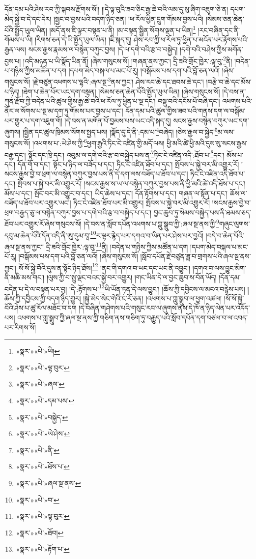 དོན་དམ་པའི་ཤེས་རབ་ཀྱི་སྐབས་རྫོགས་སོ།། །།དེ་ལྟ་བུའི་ཟབ་ཅིང་རྒྱ་ཆེ་བའི་ལམ་དུ་སུ་ཞིག་འཇུག་ཅེ་ན། དཔག་མེད་སྐྱེ་བ་དེ་དང་དེར། །སྦྱང་བ་བྱས་པའི་བདག་ཉིད་ཅན། །ཕ་རོལ་ཕྱིན་དྲུག་གོམས་བྱས་པའི། །སེམས་ཅན་ཆེན་པོའི་སྤྱོད་ཡུལ་ཡིན། །མདོ་ནས་ཇི་ལྟར་བསྟན་པ་ནི། །མ་བསྟན་སྦྱིན་སོགས་ལྡན་པ་ཡིན།\footnote{«སྣར་»«པེ་»ཡི།} །རང་བཞིན་དང་ནི་གོམས་པ་ཡི། །རིགས་ཅན་དེ་ཡི་སྤྱོད་ཡུལ་ཡིན། །ཇི་སྐད་དུ། ཤེས་རབ་ཀྱི་ཕ་རོལ་ཏུ་ཕྱིན་པ་མངོན་པར་རྟོགས་པའི་རྒྱན་ལས། སངས་རྒྱས་རྣམས་ལ་བསྙེན་བཀུར་བྱས། །དེ་ལ་དགེ་བའི་རྩ་བ་བསྐྱེད། །དགེ་བའི་བཤེས་ཀྱིས་མགོན་བྱས་པ། །འདི་མཉན་པ་ཡི་སྣོད་ཡིན་ནོ། །ཞེས་གསུངས་སོ། །གཞན་ནས་ཀྱང་། དྲི་ཟའི་གྲོང་ཁྱེར་:ལྟ་བུ་\footnote{«སྣར་»«པེ་»ལྟ་བུར་}ནི། །བདེན་པ་གཉིས་ཀྱིས་མཚོན་པ་དག །དཔག་མེད་བསྐལ་པ་མང་པོ་རུ། །བསྒོམས་པས་དག་པའི་བློ་ཅན་ལའོ། །ཞེས་གསུངས་སོ། །རྗེ་བཙུན་འཕགས་པ་ལྷའི་:ཞལ་སྔ་\footnote{«སྣར་»«པེ་»ཞལ་}ནས་ཀྱང་། ཤེས་རབ་ཆེ་དང་ཐབས་ཆེ་དང་། །བརྩེ་བ་ཆེ་དང་མོས་པ་ཉིད། །ཐེག་པ་ཆེན་པོར་ཡང་དག་བསྟན། །སེམས་ཅན་ཆེན་པོའི་སྤྱོད་ཡུལ་ཡིན། །ཞེས་གསུངས་སོ། །དེ་བས་ན་ཀུན་རྫོབ་ཀྱི་བདེན་པའི་ཚུལ་གྱིས་རྒྱ་ཆེ་བའི་ཕ་རོལ་ཏུ་ཕྱིན་པ་ལྔ་དང་། བསྡུ་བའི་དངོས་པོ་བཞི་དང་། འཕགས་པའི་ནོར་ལ་སོགས་པ་སྔ་མ་དག་ཏུ་གོམས་པར་བྱས་པ་དང་། དོན་དམ་པའི་ཚུལ་གྱིས་ཟབ་པའི་གནས་དག་ལ་བསྒོམ་པར་གྱུར་པ་དག་འཇུག་གོ། །དེ་བས་ན་མགོན་པོ་བྱམས་པས་ཡང་འདི་སྐད་དུ། སངས་རྒྱས་བསྙེན་བཀུར་ཡང་དག་ཞུགས། །སྦྱིན་དང་ཚུལ་ཁྲིམས་སོགས་སྤྱད་པས། །སྣོད་དུ་དེ་ནི་:དམ་པ་\footnote{«སྣར་»«པེ་»དམ་པས་}བཞེད། །ཅེས་རྒྱལ་བ་སྐྱེད་\footnote{«སྣར་»«པེ་»བསྐྱེད་}མ་ལས་གསུངས་སོ། །འཕགས་པ་:ཡེ་ཤེས་ཀྱི་\footnote{«སྣར་»«པེ་»ཡེ་ཤེས་}ཕྱག་རྒྱའི་ཏིང་ངེ་འཛིན་གྱི་མདོ་ལས། ཕྱི་མའི་ཚེ་ཕྱི་མའི་དུས་སུ་སངས་རྒྱས་བརྒྱ་དང་། སྟོང་དང་ཁྲི་དང་། འབུམ་ལ་དགེ་བའི་རྩ་བ་བསྐྱེད་པས་ན་\footnote{«སྣར་»«པེ་»ནི་}ཏིང་ངེ་འཛིན་འདི་:ཐོབ་པ་\footnote{«སྣར་»«པེ་»ཐོས་པ་}དང་། མོས་པ་དང་། དོན་གོ་བ་དང་། སྟོང་པ་ཉིད་ལ་བཟོད་པ་དང་། ཏིང་ངེ་འཛིན་ཐོབ་པ་དང་། སྤོབས་པ་སྐྱེ་བར་མི་འགྱུར་རོ། །སངས་རྒྱས་བྱེ་བ་ཕྲག་ལ་བསྙེན་བཀུར་བྱས་པས་ནི་དེ་དག་ལས་བཟོད་པ་ཐོབ་པ་དང་། ཏིང་ངེ་འཛིན་འདི་ཐོབ་པ་དང་། སྤོབས་པ་སྐྱེ་བར་མི་འགྱུར་རོ། །སངས་རྒྱས་ས་ཡ་ལ་བསྙེན་བཀུར་བྱས་པས་ནི་ཕྱི་མའི་ཚེ་འདི་ཐོས་པ་དང་། མོས་པ་དང་། སྤོང་བར་མི་འགྱུར་བ་དང་། ཡིད་ཆེས་པ་དང་། དོན་རྟོགས་པ་དང་། གཞན་ལ་སྟོན་པ་དང་། ཆོས་ལ་བཟོད་པ་ཐོབ་པར་འགྱུར་ཡང་། ཏིང་ངེ་འཛིན་ཐོབ་པར་མི་འགྱུར། སྤོབས་པ་སྐྱེ་བར་མི་འགྱུར་རོ། །སངས་རྒྱས་བྱེ་བ་ཕྲག་བརྒྱད་ཅུ་ལ་བསྙེན་བཀུར་བྱས་པ་དགེ་བའི་རྩ་བ་བསྐྱེད་པ་དང་། བྱང་ཆུབ་ཏུ་སེམས་བསྐྱེད་པས་ནི་ཐམས་ཅད་ཐོབ་པར་འགྱུར་རོ་ཞེས་གསུངས་སོ། །དེ་བས་ན་སློབ་དཔོན་འཕགས་པ་ཀླུ་སྒྲུབ་ཀྱི་:ཞལ་སྔ་ནས་ཀྱི་\footnote{«སྣར་»«པེ་»ཞལ་སྔ་ནས་}གཞུང་ལུགས་དབུ་མ་ཆེན་པོའི་དོན་འདི་ནི་ཨུ་དུམ་བཱ་\footnote{«སྣར་»«པེ་»བ་}ར་ལྟར་རྙེད་པར་དཀའ་བ་ཡིན་པར་ཤེས་པར་བྱའོ། །བདེ་བ་ཆེན་པོའི་ཞལ་སྔ་ནས་ཀྱང་། དྲི་ཟའི་གྲོང་ཁྱེར་:ལྟ་བུ་\footnote{«སྣར་»«པེ་»ལྟ་བུར་}ནི། །བདེན་པ་གཉིས་ཀྱིས་མཚོན་པ་དག །དཔག་མེད་བསྐལ་པ་མང་པོ་རུ། །བསྒོམས་པས་དག་པའི་བློ་ཅན་ལའོ། །ཞེས་གསུངས་སོ། །སློབ་དཔོན་རྗེ་བཙུན་ཟླ་བ་གྲགས་པའི་ཞལ་སྔ་ནས་ཀྱང་། སོ་སོ་སྐྱེ་བོའི་དུས་ན་སྟོང་ཉིད་ཐོས།\footnote{«སྣར་»«པེ་»ཐོབ།} །ནང་གི་དགའ་བ་ཡང་དང་ཡང་ནི་འབྱུང་། །དགའ་བ་ལས་བྱུང་མིག་ནི་མཆི་མས་གང་། །ལུས་ཀྱི་བ་སྤུ་ལྡང་བའང་སྐྱེ་བར་འགྱུར། །གང་ཡིན་དེ་ལ་བྱང་ཆུབ་ས་བོན་ཡོད། །དོན་དམ་བདེན་པ་དེ་ལ་བསྟན་པར་བྱ། །དེ་:རྟོགས་པ་\footnote{«སྣར་»«པེ་»རྟོག་པ་}ཡི་ཡོན་ཏན་དེ་ལས་བྱུང་། །ཆོས་ཀྱི་དབྱིངས་ལ་མངའ་བརྙེས་པས། །ཆོས་ཀྱི་དབྱིངས་ཀྱི་བདག་ཉིད་གྱུར། །སྐྱེ་མེད་སེང་གེའི་ང་རོ་ཅན། །འཕགས་པ་ཀླུ་སྒྲུབ་ལ་ཕྱག་འཚལ། །སོ་སོ་སྐྱེ་བོའི་ཤེས་པ་ཚུ་རོལ་མཐོང་བ་དག །དེ་བཞིན་གཤེགས་པའི་གསུང་རབ་ལ་ཞུགས་ནས་དེ་ཁོ་ན་ཉིད་ལེན་པར་འདོད་པས། འཕགས་པ་ཀླུ་སྒྲུབ་ཀྱི་ཞལ་སྔ་ནས་ཀྱི་གཅིག་ནས་གཅིག་ཏུ་བརྒྱུད་པའི་སློབ་དཔོན་དག་བཙལ་བ་ལ་འབད་པར་རིགས་སོ། 
